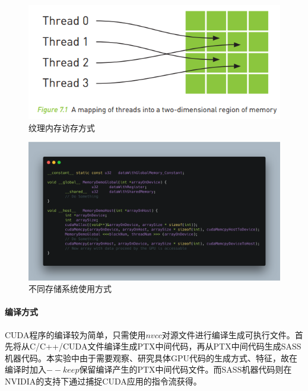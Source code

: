 \begin{figure}
	\centering
	\includegraphics[width=15cm]{figures/Fig1.jpg}
	\caption{\label{Fig.1} 纹理内存访存方式}
\end{figure}
\begin{figure}
	\centering
	\includegraphics[width=15cm]{figures/CODE2.png}
	\caption{\label{Fig.3} 不同存储系统使用方式}
\end{figure}
\paragraph{编译方式}
\par CUDA程序的编译较为简单，只需使用$ nvcc $对源文件进行编译生成可执行文件。首先将从C/C++/CUDA文件编译生成PTX中间代码，再从PTX中间代码生成SASS机器代码。本实验中由于需要观察、研究具体GPU代码的生成方式、特征，故在编译时加入$ --keep $保留编译产生的PTX中间代码文件。而SASS机器代码则在NVIDIA的支持下通过捕捉CUDA应用的指令流获得。
